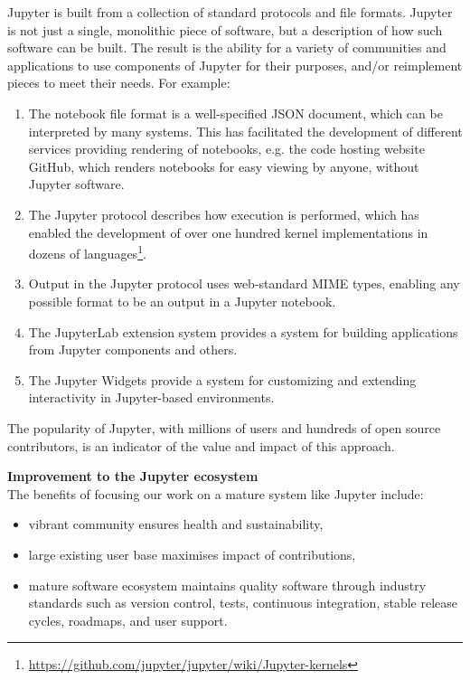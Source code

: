 Jupyter is built from a collection of standard protocols and file
formats.  Jupyter is not just a single, monolithic piece of
software, but a description of how such software can be built.  The
result is the ability for a variety of communities and applications to
use components of Jupyter for their purposes, and/or reimplement pieces to
meet their needs.
%
For example:
\begin{enumerate}
\item The notebook file format is a well-specified JSON document,
  which can be interpreted by many systems.  This has facilitated the
  development of different services providing rendering of notebooks, e.g. the code
  hosting website GitHub, which renders notebooks for easy viewing by
  anyone, without Jupyter software.
\item The Jupyter protocol describes how execution is performed, which
  has enabled the development of over one hundred kernel
  implementations in dozens of languages\footnote{\url{https://github.com/jupyter/jupyter/wiki/Jupyter-kernels}}.
\item Output in the Jupyter protocol uses web-standard MIME types,
  enabling any possible format to be an output in a Jupyter notebook.
\item The JupyterLab extension system provides a system for building
  applications from Jupyter components and others.
\item The Jupyter Widgets provide a system for customizing and
  extending interactivity in Jupyter-based environments.
\end{enumerate}

The popularity of Jupyter, with millions of users and hundreds of open
source contributors, is an indicator of the value and impact of this approach.

\medskip
\noindent\textbf{Improvement to the Jupyter ecosystem}\\
The benefits of focusing our work on a mature system like Jupyter include:

\begin{itemize}
\item vibrant community ensures health and sustainability,
\item large existing user base maximises impact of contributions,
\item mature software ecosystem maintains quality software through
  industry standards such as version control, tests, continuous
  integration, stable release cycles, roadmaps, and user support.
\end{itemize}

